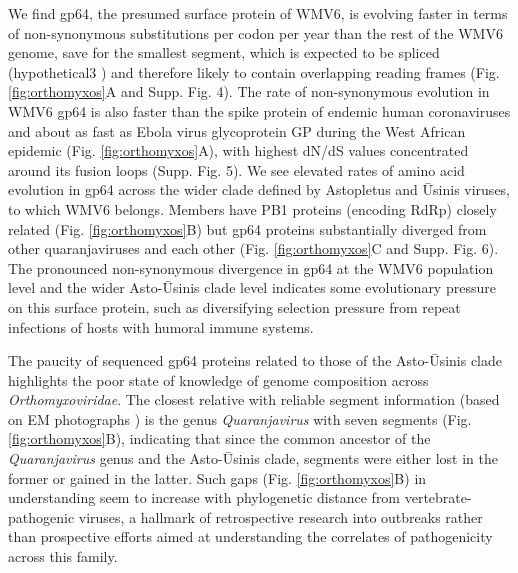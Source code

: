 \documentclass[11pt,twocolumn]{article}
\begin{document}
We find gp64, the presumed surface protein of WMV6, is evolving faster in terms of non-synonymous substitutions per codon per year than the rest of the WMV6 genome, save for the smallest segment, which is expected to be spliced (hypothetical3 \citep{batson_single_2021}) and therefore likely to contain overlapping reading frames (Fig. \ref{fig:orthomyxos}A and Supp. Fig. 4).
The rate of non-synonymous evolution in WMV6 gp64 is also faster than the spike protein of endemic human coronaviruses \citep{kistler_evidence_2021} and about as fast as Ebola virus glycoprotein GP during the West African epidemic \citep{park_ebola_2015}(Fig. \ref{fig:orthomyxos}A), with highest dN/dS values concentrated around its fusion loops \citep{garry_proteomics_2008} (Supp. Fig. 5).
We see elevated rates of amino acid evolution in gp64 across the wider clade defined by Astopletus and \={U}sinis viruses, to which WMV6 belongs. Members have PB1 proteins (encoding RdRp) closely related (Fig. \ref{fig:orthomyxos}B) but gp64 proteins substantially diverged from other quaranjaviruses and each other (Fig. \ref{fig:orthomyxos}C and Supp. Fig. 6).
The pronounced non-synonymous divergence in gp64 at the WMV6 population level and the wider Asto-\={U}sinis clade level indicates some evolutionary pressure on this surface protein, such as diversifying selection pressure from repeat infections of hosts with humoral immune systems.


The paucity of sequenced gp64 proteins related to those of the Asto-\={U}sinis clade highlights the poor state of knowledge of genome composition across \textit{Orthomyxoviridae}.
The closest relative with reliable segment information (based on EM photographs \citep{allison_cyclic_2015}) is the genus \textit{Quaranjavirus} with seven segments (Fig. \ref{fig:orthomyxos}B), indicating that since the common ancestor of the \textit{Quaranjavirus} genus and the Asto-\={U}sinis clade, segments were either lost in the former or gained in the latter.
Such gaps (Fig. \ref{fig:orthomyxos}B) in understanding seem to increase with phylogenetic distance from vertebrate-pathogenic viruses, a hallmark of retrospective research into outbreaks rather than prospective efforts aimed at understanding the correlates of pathogenicity across this family.
\end{document}
